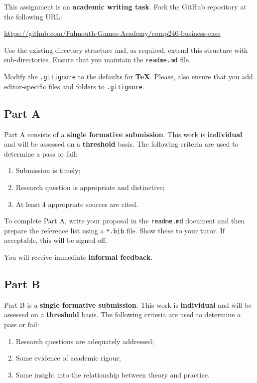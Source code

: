 \documentclass{../fal_assignment}
\newcommand{\minReferenceCount}{4 }
\begin{document}
This assignment is an \textbf{academic writing task}. Fork the GitHub repository at the following URL:

\indent \url{https://github.com/Falmouth-Games-Academy/comp240-business-case}

Use the existing directory structure and, as required, extend this structure with sub-directories. Ensure that you maintain the \texttt{readme.md} file.

Modify the \texttt{.gitignore} to the defaults for \textbf{TeX}. Please, also ensure that you add editor-specific files and folders to \texttt{.gitignore}. 

\subsection*{Part A}

Part A consists of a \textbf{single formative submission}. This work is \textbf{individual} and will be assessed on a \textbf{threshold} basis. The following criteria are used to determine a pass or fail:

\begin{enumerate}[label=(\alph*)]
	\item Submission is timely;
	\item Research question is appropriate and distinctive;
	\item At least \minReferenceCount  appropriate sources are cited.
\end{enumerate}

To complete Part A, write your proposal in the \texttt{readme.md} document and then prepare the reference list using a \texttt{*.bib} file.  Show these to your tutor.  If acceptable, this will be signed-off. 

You will receive immediate \textbf{informal feedback}.

\subsection*{Part B}

Part B is a \textbf{single formative submission}. This work is \textbf{individual} and will be assessed on a \textbf{threshold} basis. The following criteria are used to determine a pass or fail:

\begin{enumerate}[label=(\alph*)]
	\item Research questions are adequately addressed;
	\item Some evidence of academic rigour;
	\item Some insight into the relationship between theory and practice.
\end{enumerate}
\end{document}
